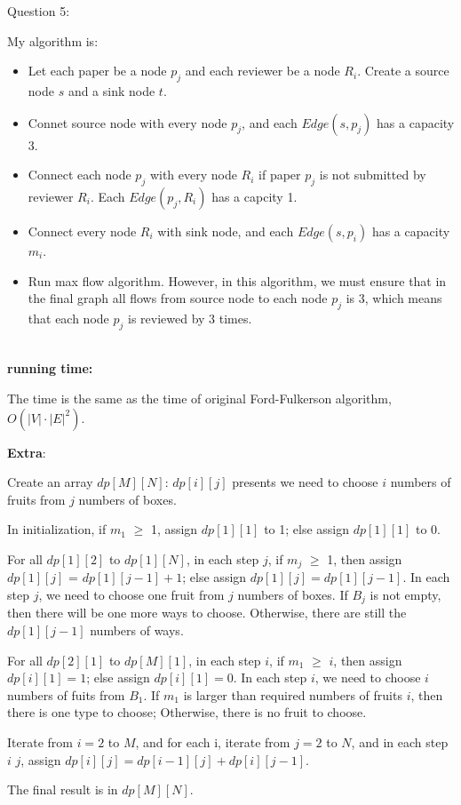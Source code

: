 \documentclass[12pt]{article}
\begin{document}
\pagebreak
\noindent
\large Question 5: \par
\normalsize 
My algorithm is:
\begin{itemize}
  \item	Let each paper be a node $p_j$ and each reviewer be a node $R_i$. Create a source node $s$ and a sink node $t$.
  \item Connet source node with every node $p_j$, and each $Edge(s, p_j)$ has a capacity $3$. 
  \item Connect each node $p_j$ with every node $R_i$ if paper $p_j$ is not submitted by reviewer $R_i$.  
	Each $Edge(p_j, R_i)$ has a capcity 1. 
  \item Connect every node $R_i$ with sink node, and each $Edge(s, p_i)$ has a capacity $m_i$.
  \item Run max flow algorithm. 
	However, in this algorithm, we must ensure that in the final graph all flows from source node to each node $p_j$ is 3, 
	which means that each node $p_j$ is reviewed by 3 times.
\end{itemize}

\noindent \\
\textbf{running time:} \par
The time is the same as the time of original Ford-Fulkerson algorithm, $O(|V|\cdot|E|^2)$.



\pagebreak
\large \textbf{Extra}:\\ \vspace{5mm}\par
\normalsize 

Create an array $dp[M][N]$: $dp[i][j]$ presents we need to choose $i$ numbers of fruits from $j$ numbers of boxes. \par
In initialization, if $m_1$ $\geq$ 1, assign $dp[1][1]$ to 1; else assign $dp[1][1]$ to 0. \par
For all $dp[1][2]$ to $dp[1][N]$, in each step $j$, if $m_j$ $\geq$ 1, then assign $dp[1][j]$ = $dp[1][j - 1] + 1$; else assign $dp[1][j] = dp[1][j - 1]$. 
In each step $j$, we need to choose one fruit from $j$ numbers of boxes. 
If $B_j$ is not empty, then there will be one more ways to choose.
Otherwise, there are still the $dp[1][j - 1]$ numbers of ways. \par
For all $dp[2][1]$ to $dp[M][1]$, in each step $i$, if $m_1$ $\geq$ $i$, then assign $dp[i][1] = 1$; else assign $dp[i][1] = 0$. 
In each step $i$, we need to choose $i$ numbers of fuits from $B_1$.
If $m_1$ is larger than required numbers of fruits $i$, then there is one type to choose; Otherwise, there is no fruit to choose. \par
Iterate from $i = 2$ to $M$, and for each i, iterate from $j = 2$ to $N$, 
and in each step $i$ $j$, assign $dp[i][j] = dp[i - 1][j] + dp[i][j - 1]$. \par
The final result is in $dp[M][N]$.
\end{document}
